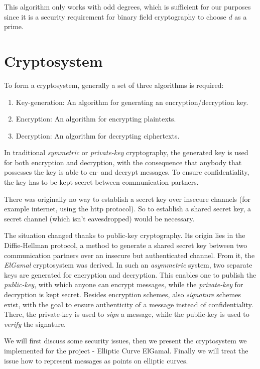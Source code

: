 \documentclass[11pt,english]{article}
\begin{document}
This algorithm only works with odd degrees, which is sufficient for our purposes since it is a security requirement for binary field cryptography to choose $d$ as a prime.

\section{Cryptosystem}
To form a cryptosystem, generally a set of three algorithms is required:
\begin{enumerate}
 \item Key-generation: An algorithm for generating an encryption/decryption key.
 \item Encryption: An algorithm for encrypting plaintexts.
 \item Decryption: An algorithm for decrypting ciphertexts.
\end{enumerate}
In traditional \emph{symmetric} or \emph{private-key} cryptography, the generated key is used for both encryption and decryption, with the consequence that anybody that possesses the key is able to en- and decrypt messages. To ensure confidentiality, the key has to be kept secret between communication partners.

There was originally no way to establish a secret key over insecure channels (for example internet, using the http protocol). So to establish a shared secret key, a secret channel (which isn't eavesdropped) would be necessary.

The situation changed thanks to public-key cryptography. Its origin lies in the Diffie-Hellman \cite{Diffie76newdirections} protocol, a method to generate a shared secret key between two communication partners over an insecure but authenticated channel. From it, the \emph{ElGamal} cryptosystem \cite{19480} was derived. In such an \emph{asymmetric} system, two separate keys are generated for encryption and decryption. This enables one to publish the \emph{public-key}, with which anyone can encrypt messages, while the \emph{private-key} for decryption is kept secret. Besides encryption schemes, also \emph{signature} schemes exist, with the goal to ensure authenticity of a message instead of confidentiality. There, the private-key is used to \emph{sign} a message, while the public-key is used to \emph{verify} the signature.

We will first discuss some security issues, then we present the cryptosystem we implemented for the project - Elliptic Curve ElGamal. Finally we will treat the issue how to represent messages as points on elliptic curves.
\end{document}
